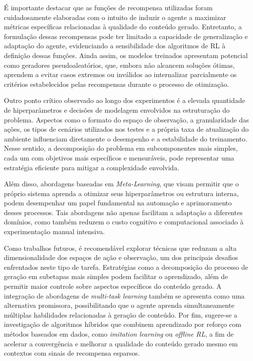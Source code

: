 É importante destacar que as funções de recompensa utilizadas foram cuidadosamente elaboradas com o 
intuito de induzir o agente a maximizar métricas específicas relacionadas à qualidade do conteúdo gerado. 
Entretanto, a formulação dessas recompensas pode ter limitado a capacidade de generalização e adaptação do agente, 
evidenciando a sensibilidade dos algoritmos de RL à definição dessas funções. Ainda assim, os modelos 
treinados apresentam potencial como geradores pseudoaleatórios, que, embora não alcancem soluções ótimas, 
aprendem a evitar casos extremos ou inválidos ao internalizar parcialmente os critérios estabelecidos pelas 
recompensas durante o processo de otimização.

Outro ponto crítico observado ao longo dos experimentos é a elevada quantidade de hiperparâmetros 
e decisões de modelagem envolvidos na estruturação do problema. Aspectos como o formato do espaço de observação, 
a granularidade das ações, os tipos de cenários utilizados nos testes e a própria taxa de atualização do ambiente 
influenciam diretamente o desempenho e a estabilidade do treinamento. Nesse sentido, a decomposição do 
problema em subcomponentes mais simples, cada um com objetivos mais específicos e mensuráveis,
pode representar uma estratégia eficiente para mitigar a complexidade envolvida.

Além disso, abordagens baseadas em \textit{Meta-Learning}, que visam permitir que o próprio sistema aprenda a 
otimizar seus hiperparâmetros ou estrutura interna, podem desempenhar um papel fundamental na automação e 
aprimoramento desses processos. Tais abordagens não apenas facilitam a adaptação a diferentes domínios, 
como também reduzem o custo cognitivo e computacional associado à experimentação manual intensiva.

Como trabalhos futuros, é recomendável explorar técnicas que reduzam a alta dimensionalidade dos espaços 
de ação e observação, um dos principais desafios enfrentados neste tipo de tarefa. 
Estratégias como a decomposição do processo de geração em subetapas mais simples podem facilitar o 
aprendizado, além de permitir maior controle sobre aspectos específicos do conteúdo gerado. 
A integração de abordagens de \textit{multi-task learning} também se apresenta como uma alternativa promissora, 
possibilitando que o agente aprenda simultaneamente múltiplas habilidades relacionadas à geração de conteúdo. 
Por fim, sugere-se a investigação de algoritmos híbridos que combinem aprendizado por reforço com métodos 
baseados em dados, como \textit{imitation learning} ou \textit{offline RL}, a fim de acelerar a convergência 
e melhorar a qualidade do conteúdo gerado mesmo em contextos com sinais de recompensa esparsos.




